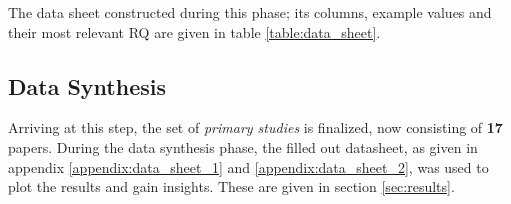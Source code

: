 The data sheet constructed during this phase; its columns, example values and their most relevant RQ are given in table \ref{table:data_sheet}.

\subsection{Data Synthesis}
\label{sec:study_design:data_synth}
Arriving at this step, the set of \textit{primary studies} is finalized, now consisting of \textbf{17} papers.
During the data synthesis phase, the filled out datasheet, as given in appendix \ref{appendix:data_sheet_1} and \ref{appendix:data_sheet_2}, 
was used to plot the results and gain insights.
These are given in section \ref{sec:results}.